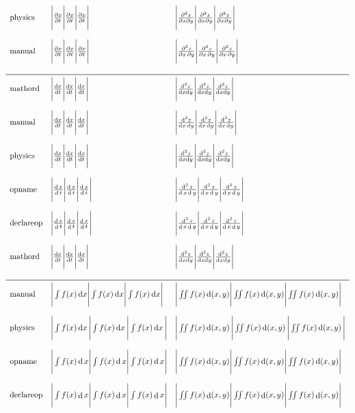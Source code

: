 \documentclass{standalone}
\newcommand{\ddalt}{\mathop{}\!\mathrm{d}}
\newcommand{\ddord}{\mathord{\mathrm{d}}}
\newcommand{\ddop}{\operatorname{d}}
\newcommand{\pp}{\mathop{}\!\partial}
\DeclareMathOperator*{\ddOP}{d}
\def\repeat#1{\Bigg|#1\Bigg|#1\Bigg|#1\Bigg|}
\begin{document}
$\begin{array}{llll}
\text{physics}   & \repeat{\pdv{x}{t}}       & \repeat{\pdv{z}{x}{y}}        \\\\
\text{manual}    & \repeat{\frac{\pp{x}}{\pp{t}}} & \repeat{\frac{\pp^2{z}}{\pp{x}\pp{y}}}  \\\\
\midrule
\text{mathord}   & \repeat{\frac{\ddord{x}}{\ddord{t}}} & \repeat{\frac{\ddord^2{z}}{\ddord{x}\ddord{y}}}  \\\\
\text{manual}    & \repeat{\frac{\ddalt{x}}{\ddalt{t}}} & \repeat{\frac{\ddalt^2{z}}{\ddalt{x}\ddalt{y}}}  \\\\
\text{physics}   & \repeat{\frac{\dd{x}}{\dd{t}}}       & \repeat{\frac{\dd^2{z}}{\dd{x}\dd{y}}}        \\\\
\text{opname}    & \repeat{\frac{\ddop{x}}{\ddop{t}}}   & \repeat{\frac{\ddop^2{z}}{\ddop{x}\ddop{y}}}    \\\\
\text{declareop} & \repeat{\frac{\ddOP{x}}{\ddOP{t}}}   & \repeat{\frac{\ddOP^2{z}}{\ddOP{x}\ddOP{y}}}    \\\\
\text{mathord}   & \repeat{\frac{\ddord{x}}{\ddord{t}}} & \repeat{\frac{\ddord^2{z}}{\ddord{x}\ddord{y}}}  \\\\
\midrule
\text{manual}    & \repeat{\int f(x)\ddalt{x}} & \repeat{\iint f(x)\ddalt(x,y)} \\\\
\text{physics}   & \repeat{\int f(x)\dd{x}}    & \repeat{\iint f(x)\dd(x,y)} \\\\
\text{opname}    & \repeat{\int f(x)\ddop{x}}  & \repeat{\iint f(x)\ddop(x,y)} \\\\
\text{declareop} & \repeat{\int f(x)\ddOP{x}}  & \repeat{\iint f(x)\ddOP(x,y)} \\\\
\end{array}$
\end{document}
